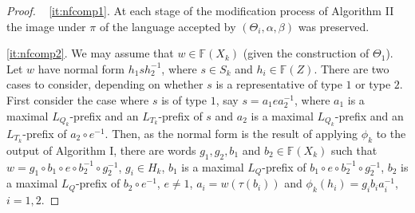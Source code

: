 \documentclass[a4paper,12pt]{article}
\renewcommand{\a}{\alpha }
\renewcommand{\b}{\beta }
\newcommand{\T}{\Theta }
\renewcommand{\t}{\tau }
\numberwithin{equation}{section}
\numberwithin{figure}{section}
\newcommand{\FF}{\ensuremath{\mathbb{F}}}
\begin{document}
\begin{proof} ~
\ref{it:nfcomp1}.
At each stage of the modification process of Algorithm
II the image under $\pi$ of the language accepted by $(\T_i,\a,\b)$  was
preserved.

\ref{it:nfcomp2}.
We may assume that $w\in \FF(X_k)$ (given the construction of $\T_1$).
Let $w$ have normal form $h_1s h_2^{-1}$, where $s\in S_k$ and $h_i\in \FF(Z)$.
There are two cases to consider, depending on whether $s$ is a
representative of type $1$ or type $2$.
 First consider the case where $s$ is of type $1$, say
 $s= a_1 e a_2^{-1}$, where
$a_1$ is a maximal $L_{Q_k}$-prefix and an $L_{T_k}$-prefix of $s$ and
 $a_2$  is a maximal $L_{Q_k}$-prefix and an $L_{T_k}$-prefix of $a_2\circ e^{-1}$.
 Then, as the normal form is the result of applying $\phi_k$ to the
output of Algorithm I,
 there are words
$g_1, g_2, b_1$ and $b_2\in \FF(X_k)$ such that
$w=g_1\circ b_1\circ e \circ b_2^{-1}\circ g_2^{-1}$,
$g_i\in H_k$, $b_1$ is a maximal $L_Q$-prefix of
$b_1\circ e \circ b_2^{-1}\circ g_2^{-1}$,
$b_2$ is a maximal $L_Q$-prefix of $b_2\circ e^{-1}$, $e\neq 1$,
$a_i=w(\t(b_i))$ and $\phi_k(h_i)=g_ib_ia_i^{-1}$, $i=1,2$.


\end{proof}
\end{document}
